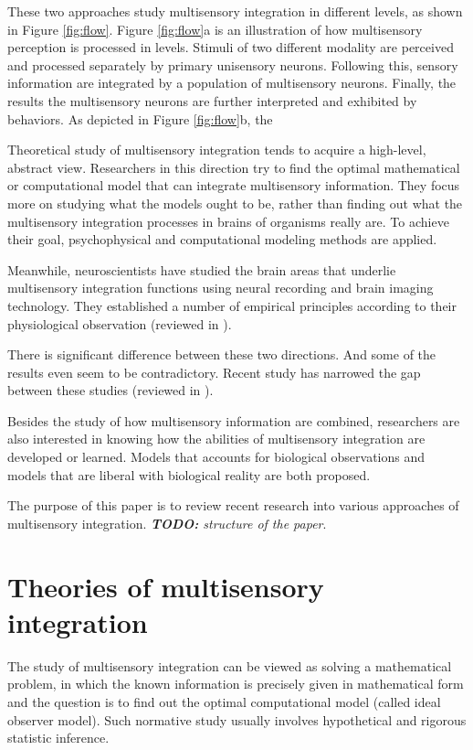 \documentclass{article}[11pt]
\newcommand{\TODO}[1]{\emph{\small{{\bf TODO: } #1}}}
\begin{document}
These two approaches study multisensory integration in different levels, as shown in Figure \ref{fig:flow}.
Figure \ref{fig:flow}a is an illustration of how multisensory perception is processed in levels. Stimuli of two different modality are perceived and processed separately by primary unisensory neurons. Following this, sensory information are integrated by a population of multisensory neurons. Finally, the results the multisensory neurons are further interpreted and exhibited by behaviors.
As depicted in Figure \ref{fig:flow}b, the 

Theoretical study of multisensory integration tends to acquire a high-level, abstract view. Researchers in this direction try to find the optimal mathematical or computational model that can integrate multisensory information. They focus more on studying what the models ought to be, rather than finding out what the multisensory integration processes in brains of organisms really are.
To achieve their goal, psychophysical and computational modeling methods are applied.

Meanwhile, neuroscientists have studied the brain areas that underlie multisensory integration functions using neural recording and brain imaging technology. They established a number of empirical principles according to their physiological observation (reviewed in \cite{stein_multisensory_2008}).

There is significant difference between these two directions. And some of the results even seem to be contradictory. Recent study has narrowed the gap between these studies (reviewed in \cite{fetsch_bridging_2013}).

Besides the study of how multisensory information are combined, researchers are also interested in knowing how the abilities of multisensory integration are developed or learned. Models that accounts for biological observations and models that are liberal with biological reality are both proposed.

The purpose of this paper is to review recent research into various approaches of multisensory integration.
\TODO{structure of the paper}.

\section{Theories of multisensory integration}
The study of multisensory integration can be viewed as solving a mathematical problem, in which the known information is precisely given in mathematical form and the question is to find out the optimal computational model (called ideal observer model). Such normative study usually involves hypothetical and rigorous statistic inference.
\end{document}
